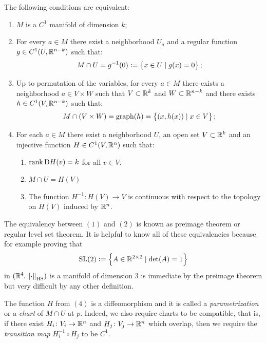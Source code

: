 \documentclass[11pt,a4paper]{article}
\DeclareMathOperator{\HS}{HS} %
\begin{document}
\begin{proposition}
  The following conditions are equivalent:
  \begin{enumerate}
    \item[(1)] $M$ is a $C^1$ manifold of dimension $k$;
    \item[(2)] For every $a \in M$ there exist a neighborhood $U_a$ and a 
    regular function $g \in C^1(U,\mathbb{R}^{n-k})$ such that:
    \[
      M \cap U = g^{-1}(0) := \left\{x \in U \mid g(x) = 0\right\};
    \]
  \item[(3)] Up to permutation of the variables, for every $a \in M$
    there exists a neighborhood $a \in V \times W$ such that 
    $V \subset \mathbb{R}^k$ and $W \subset \mathbb{R}^{n-k}$ and there exists
    $h \in C^1(V, \mathbb{R}^{n-k})$ such that:
    \[
      M \cap (V \times W) = \operatorname{graph}(h) = 
      \left\{(x,h(x)) \mid x \in V\right\};
    \]
  \item[(4)] For each $a \in M$ there exist a neighborhood $U$, an open
    set $V \subset \mathbb{R}^k$ and an injective function $H \in C^1(V,\mathbb{R}^n)$
    such that:
    \begin{enumerate}
    \item $\operatorname{rank} \mathrm{D} H(v) = k$ for all $v \in V$.
    \item $M \cap U = H(V)$
    \item The function $H^{-1} \colon H(V) \to V$ is continuous
    with respect to the topology on $H(V)$ induced by $\mathbb{R}^n$.
    \end{enumerate}
  \end{enumerate}
\end{proposition}
\begin{remark}
  The equivalency between $(1)$ and $(2)$
  is known as preimage theorem or regular level set theorem.
  It is helpful to know all of these equivalencies because
  for example proving that
  \[
    \mathrm{SL}(2) := \left\{A \in \mathbb{R}^{2 \times 2} \mid \det(A) = 1\right\}
  \]
  in $(\R^4,\norm{\cdot}_{\HS})$ is a manifold of dimension $3$
  is immediate by the preimage theorem but very difficult by any
  other definition.
\end{remark}
\begin{remark}
  \label{rem:parameterization}
  The function $H$ from $(4)$ is a diffeomorphism and it
  is called a \textit{parametrization} or a \textit{chart}
  of $M \cap U$ at $p$.
  Indeed, we also require charts to be compatible,
  that is,
  if there exist $H_i \colon V_i \to \mathbb{R}^n$ and $H_j \colon V_j \to \mathbb{R}^n$
  which overlap, then we require the \textit{transition map}
  $H_i^{-1} \circ H_j$ to be $C^1$.
\end{remark}
\end{document}
